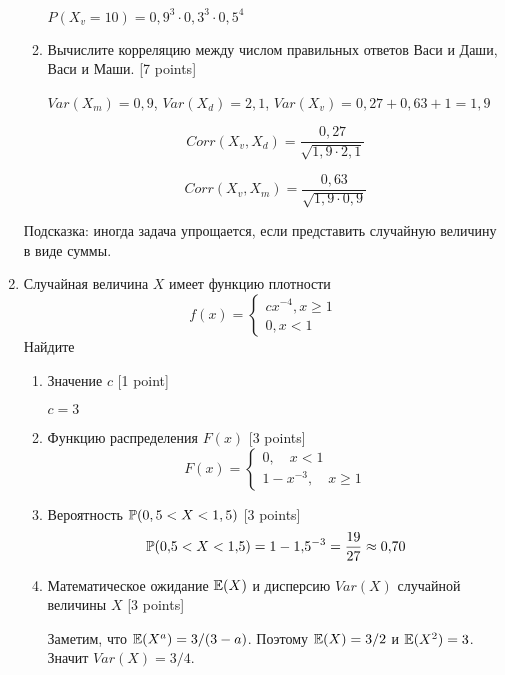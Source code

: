 \documentclass[pdftex,12pt,a4paper]{article}
\begin{document}
\begin{enumerate}
\begin{enumerate}
$P(X_v=10)=0{,}9^3\cdot 0{,}3^3\cdot 0{,}5^4$
\item Вычислите  корреляцию между числом правильных ответов Васи и Даши, Васи и Маши. [7 points]

$Var(X_m)=0{,}9$, $Var(X_d)=2{,}1$, $Var(X_v)=0{,}27+0{,}63+1=1{,}9$ 

\begin{equation}
Corr(X_v,X_d)=\frac{0{,}27}{\sqrt{1{,}9\cdot 2{,}1}}
\end{equation}

\begin{equation}
Corr(X_v,X_m)=\frac{0{,}63}{\sqrt{1{,}9\cdot 0{,}9}}
\end{equation}

\end{enumerate}
Подсказка: иногда задача упрощается, если представить случайную величину в виде суммы.
\item Случайная величина $X$ имеет функцию плотности
\begin{equation}
f(x)=
\begin{cases}
	cx^{-4}, x\geq 1 \\
	0, x<1
\end{cases}
\end{equation}
Найдите
\begin{enumerate}
\item Значение $c$ [1 point]

$c=3$
\item Функцию распределения $F(x)$ [3 points]
\begin{equation}
F(x)=
\begin{cases}
0, \quad x<1 \\
1-x^{-3}, \quad x\geq 1
\end{cases}
\end{equation}
\item Вероятность $\P(0,5<X<1,5)$ [3 points]
\begin{equation}
\P(0{,}5<X<1{,}5)=1-1{,}5^{-3}=\frac{19}{27}\approx 0{,}70
\end{equation}
\item Математическое ожидание $\E(X)$ и дисперсию $Var(X)$ случайной величины $X$ [3 points]

Заметим, что $\E(X^a)=3/(3-a)$. Поэтому $\E(X)=3/2$ и $\E(X^2)=3$. Значит $Var(X)=3/4$.
\end{enumerate}


\end{enumerate}
\end{document}
